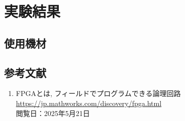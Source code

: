 \documentclass{jlreq}
\numberwithin{equation}{section}
\begin{document}


\section{実験結果}

\subsection{使用機材}

\subsection{参考文献}
\begin{enumerate}
  \item FPGAとは, フィールドでプログラムできる論理回路 \\
    \url{https://jp.mathworks.com/discovery/fpga.html}\\
    閲覧日：2025年5月21日
\end{enumerate}
\end{document}
